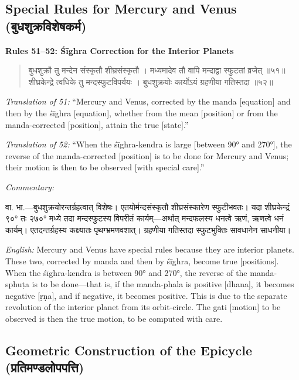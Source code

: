 \documentclass[11pt,a4paper]{book}
\newcommand{\dev}[1]{{\devanagarifont #1}}
\newenvironment{shloka}{%
  \begin{verse}
  \devanagarifont\color{versecolor}%
}{\end{verse}}
\newenvironment{vasaanaskt}{%
  \par\vspace{0.5em}\noindent\small\textit{Commentary:}%
}{\par\vspace{0.5em}}
\newcommand{\ruleheading}[1]{%
  \par\vspace{0.8em}\noindent\textbf{\color{sectioncolor}#1}\par\vspace{0.3em}%
}
\begin{document}
\subsection{Special Rules for Mercury and Venus (\dev{बुधशुक्रविशेषकर्म})}

\ruleheading{Rules 51--52: Śīghra Correction for the Interior Planets}

\begin{shloka}
\begin{altverse}
\dev{बुधशुक्रौ तु मन्देन संस्कृतौ शीघ्रसंस्कृतौ ।}
\dev{मध्यमादेव तौ वापि मन्दाद्वा स्फुटतां व्रजेत् ॥५१॥}
\dev{शीघ्रकेन्द्रे त्वधिके तु मन्दस्फुटविपर्ययः ।}
\dev{बुधशुक्रयोः कार्योऽयं ग्रहणीया गतिस्तदा ॥५२॥}
\end{altverse}
\end{shloka}

\textit{Translation of 51:} ``Mercury and Venus, corrected by the manda [equation] and then by the śīghra [equation], whether from the mean [position] or from the manda-corrected [position], attain the true [state].''

\textit{Translation of 52:} ``When the śīghra-kendra is large [between 90° and 270°], the reverse of the manda-corrected [position] is to be done for Mercury and Venus; their motion is then to be observed [with special care].''

\begin{vasaanaskt}
\dev{वा. भा.}---बुधशुक्रयोरन्तर्ग्रहत्वात् विशेषः। एतयोर्मन्दसंस्कृतौ शीघ्रसंस्कारेण स्फुटीभवतः। यदा शीघ्रकेन्द्रं ९०° तः २७०° मध्ये तदा मन्दस्फुटस्य विपरीतं कार्यम्---अर्थात् मन्दफलस्य धनत्वे ऋणं, ऋणत्वे धनं कार्यम्। एतदन्तर्ग्रहस्य कक्ष्यातः पृथग्भ्रमणवशात्। ग्रहणीया गतिस्तदा स्फुटभुक्तिः सावधानेन साधनीया।

\textit{English:} Mercury and Venus have special rules because they are interior planets. These two, corrected by manda and then by śīghra, become true [positions]. When the śīghra-kendra is between 90° and 270°, the reverse of the manda-sphuṭa is to be done---that is, if the manda-phala is positive [dhana], it becomes negative [ṛṇa], and if negative, it becomes positive. This is due to the separate revolution of the interior planet from its orbit-circle. The gati [motion] to be observed is then the true motion, to be computed with care.
\end{vasaanaskt}

\clearpage

\subsection{Geometric Construction of the Epicycle (\dev{प्रतिमण्डलोपपत्ति})}
\end{document}
